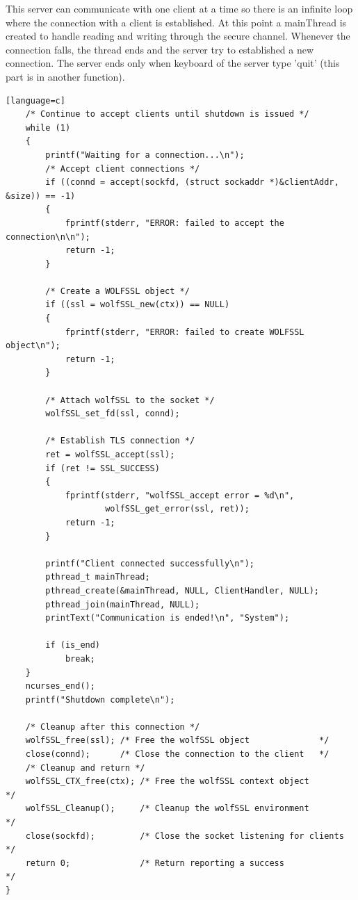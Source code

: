 \documentclass[a4paper,12pt]{article}
\begin{document}
This server can communicate with one client at a time so there is an infinite loop where the connection with a client is established. At this point a mainThread is created to handle reading and writing through the secure channel. Whenever the connection falls, the thread ends and the server try to established a new connection. The server ends only when keyboard of the server type 'quit' (this part is in another function).
\begin{lstlisting}[caption={int main() of SSL server, 2* part},captionpos=b][language=c]
    /* Continue to accept clients until shutdown is issued */
    while (1)
    {
	    printf("Waiting for a connection...\n");
        /* Accept client connections */
        if ((connd = accept(sockfd, (struct sockaddr *)&clientAddr, &size)) == -1)
        {
            fprintf(stderr, "ERROR: failed to accept the connection\n\n");
            return -1;
        }

        /* Create a WOLFSSL object */
        if ((ssl = wolfSSL_new(ctx)) == NULL)
        {
            fprintf(stderr, "ERROR: failed to create WOLFSSL object\n");
            return -1;
        }

        /* Attach wolfSSL to the socket */
        wolfSSL_set_fd(ssl, connd);

        /* Establish TLS connection */
        ret = wolfSSL_accept(ssl);
        if (ret != SSL_SUCCESS)
        {
            fprintf(stderr, "wolfSSL_accept error = %d\n",
                    wolfSSL_get_error(ssl, ret));
            return -1;
        }

        printf("Client connected successfully\n");
        pthread_t mainThread;
        pthread_create(&mainThread, NULL, ClientHandler, NULL);
        pthread_join(mainThread, NULL);
        printText("Communication is ended!\n", "System");

        if (is_end)
            break;
    }
    ncurses_end();
    printf("Shutdown complete\n");

    /* Cleanup after this connection */
    wolfSSL_free(ssl); /* Free the wolfSSL object              */
    close(connd);      /* Close the connection to the client   */
    /* Cleanup and return */
    wolfSSL_CTX_free(ctx); /* Free the wolfSSL context object          */
    wolfSSL_Cleanup();     /* Cleanup the wolfSSL environment          */
    close(sockfd);         /* Close the socket listening for clients   */
    return 0;              /* Return reporting a success               */
}
\end{lstlisting}
\end{document}

